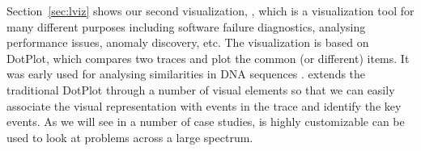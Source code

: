Section~\ref{sec:lviz} shows our second visualization, , which
is a visualization tool for many different purposes including
software failure diagnostics,
analysing performance issues, anomaly discovery, etc.
The visualization is based on DotPlot, which compares two traces
and plot the common (or different) items.
It was early used for
analysing similarities in DNA sequences \cite{maizel1981enhanced}.
 extends the traditional DotPlot through a number of visual elements
so that we can easily associate the visual representation with events in the
trace and identify the key events.
As we will see in a number of case studies,
 is highly customizable can be used to look at problems
across a large spectrum.
